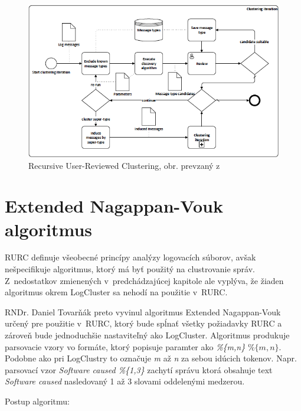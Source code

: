 \begin{figure}[htbp]
 \centering 
 \begin{minipage}{\linewidth}
 	\centering
 	\includegraphics[width=\textwidth]{images/RURC.png} 	
 \end{minipage}
  \caption{Recursive User-Reviewed Clustering, obr. prevzaný z~\parencite{Tovarnak2017}}
  \label{fig:rurc}
\end{figure}


\section{Extended Nagappan-Vouk algoritmus}
\label{sec:eng}
RURC definuje všeobecné princípy analýzy logovacích súborov, avšak nešpecifikuje algoritmus, ktorý má byť použitý na clustrovanie správ.
Z~nedostatkov zmienených v~predchádzajúcej kapitole ale vyplýva, že žiaden algoritmus okrem LogCluster sa nehodí na použitie v~RURC.
\par RNDr. Daniel Tovarňák preto vyvinul algoritmus Extended Na\-gappan-Vouk určený pre použitie v~RURC, ktorý bude spĺnať všetky požiadavky RURC a zároveň bude jednoduchšie nastaviteľný ako LogCluster. Algoritmus produkuje parsovacie vzory vo formáte, ktorý popisuje paramter ako \emph{\%\{m,n\}} $\%\{m,n\}$. Podobne ako pri LogClustry to označuje \emph{m} až \emph{n} za sebou idúcich tokenov. Napr. parsovací vzor \emph{Software caused \%\{1,3\}} zachytí správu ktorá obsahuje text \emph{Software caused} nasledovaný 1 až 3 slovami oddelenými medzerou. \newpage \par Postup algoritmu:

